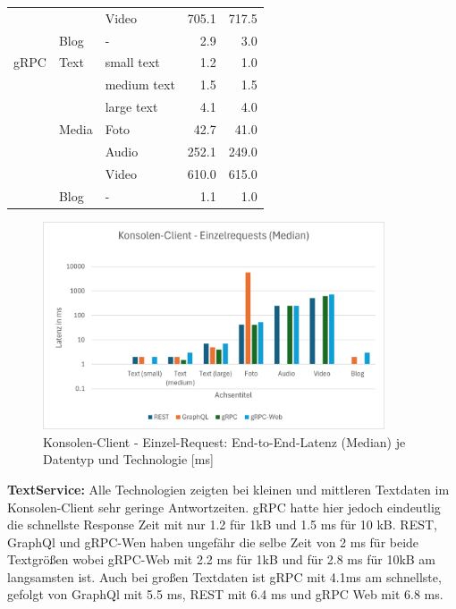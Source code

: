 \begin{table}[h]
\begin{tabular}{|l|l|l|r|r|}
		&       & Video       & 705.1 & 717.5 \\
		& Blog  & -           & 2.9 & 3.0 \\
		\hline
		gRPC & Text  & small text  & 1.2 & 1.0 \\
		&       & medium text & 1.5 & 1.5 \\
		&       & large text  & 4.1 & 4.0 \\
		& Media & Foto        & 42.7 & 41.0 \\
		&       & Audio       & 252.1 & 249.0 \\
		&       & Video       & 610.0 & 615.0 \\
		& Blog  & -           & 1.1 & 1.0 \\
		\hline
	\end{tabular}
\end{table}

\clearpage

\begin{figure}[htbp]
	\centering
	\includegraphics[width=0.9\textwidth]{images/Konsolenclient.png}
	\caption{Konsolen-Client - Einzel-Request: End-to-End-Latenz (Median) je Datentyp und Technologie [ms]}
	\label{fig:console-client-1req}
\end{figure}

\textbf{TextService:}  
Alle Technologien zeigten bei kleinen und mittleren Textdaten im Konsolen-Client sehr geringe Antwortzeiten. gRPC hatte hier jedoch eindeutlig die schnellste Response Zeit mit nur 1.2 für 1kB und 1.5 ms für 10 kB. REST, GraphQl und gRPC-Wen haben ungefähr die selbe Zeit von 2 ms für beide Textgrößen wobei gRPC-Web mit 2.2 ms für 1kB und für  2.8 ms für 10kB am langsamsten ist.
Auch bei großen Textdaten ist gRPC mit 4.1ms am schnellste, gefolgt von GraphQl mit 5.5 ms, REST mit 6.4 ms und gRPC Web mit 6.8 ms.


